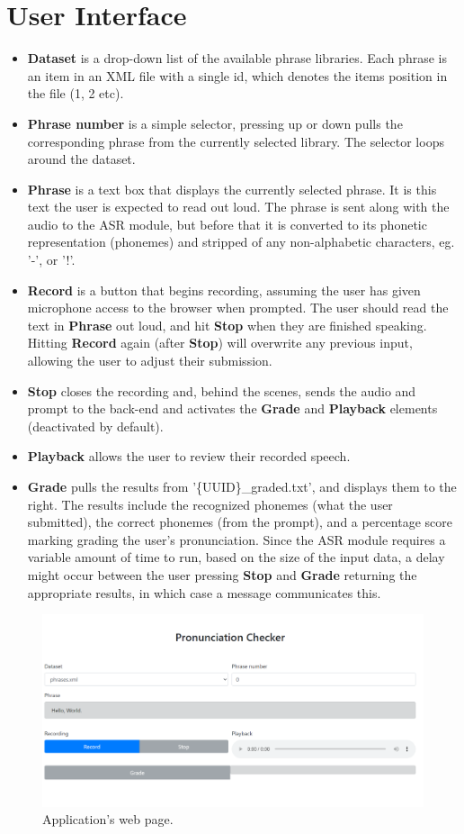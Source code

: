\documentclass[12pt, letterpaper]{article}
\begin{document}
\section*{User Interface}
\begin{itemize}
    \item \textbf{Dataset} is a drop-down list of the available phrase libraries. Each phrase is an item in an XML file with a single id, which denotes the items position in the file (1, 2 etc).
    \item \textbf{Phrase number} is a simple selector, pressing up or down pulls the corresponding phrase from the currently selected library. The selector loops around the dataset.
    \item \textbf{Phrase} is a text box that displays the currently selected phrase. It is this text the user is expected to read out loud. The phrase is sent along with the audio to the ASR module, but before that it is converted to its phonetic representation (phonemes) and stripped of any non-alphabetic characters, eg. '-', or '!'.
    \item \textbf{Record} is a button that begins recording, assuming the user has given microphone access to the browser when prompted. The user should read the text in \textbf{Phrase} out loud, and hit \textbf{Stop} when they are finished speaking. Hitting \textbf{Record} again (after \textbf{Stop}) will overwrite any previous input, allowing the user to adjust their submission.
    \item \textbf{Stop} closes the recording and, behind the scenes, sends the audio and prompt to the back-end and activates the \textbf{Grade} and \textbf{Playback} elements (deactivated by default).
    \item \textbf{Playback} allows the user to review their recorded speech. 
    \item \textbf{Grade} pulls the results from '\{UUID\}\_graded.txt', and displays them to the right. The results include the recognized phonemes (what the user submitted), the correct phonemes (from the prompt), and a percentage score marking grading the user's pronunciation. Since the ASR module requires a variable amount of time to run, based on the size of the input data, a delay might occur between the user pressing \textbf{Stop} and \textbf{Grade} returning the appropriate results, in which case a message communicates this. 
\end{itemize}

\begin{figure}[h!]
    \centering
    \includegraphics[scale=0.55]{images/homepage.pdf}
    \caption{Application's web page.}
\end{figure}
\end{document}
